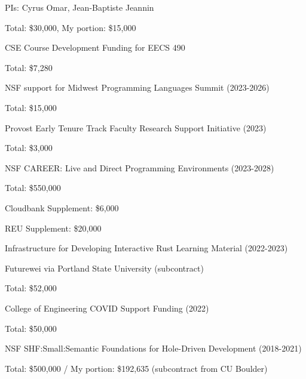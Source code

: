 \documentclass[10pt,letterpaper]{article}
\renewenvironment{itemize}{
  \begin{list}{}{
    \setlength{\leftmargin}{1.25em}
    \setlength{\itemsep}{0.25em}
    \setlength{\parskip}{0pt}
    \setlength{\parsep}{0.2em}
  }
}{
  \end{list}
}
\begin{document}
\begin{itemize}
        \begin{itemize}
          \item PIs: Cyrus Omar, Jean-Baptiste Jeannin
          \item Total: \$30,000, My portion: \$15,000
        \end{itemize}
  \item CSE Course Development Funding for EECS 490
        \begin{itemize}
          \item Total: \$7,280
        \end{itemize}
  \item NSF support for Midwest Programming Languages Summit (2023-2026)
        \begin{itemize}
          \item Total: \$15,000
        \end{itemize}
  \item Provost Early Tenure Track Faculty Research Support Initiative (2023)
        \begin{itemize}
          \item Total: \$3,000
        \end{itemize}
  \item NSF CAREER: Live and Direct Programming Environments (2023-2028)
        \begin{itemize}
          \item Total: \$550,000
          \item Cloudbank Supplement: \$6,000
          \item REU Supplement: \$20,000
        \end{itemize}
  \item Infrastructure for Developing Interactive Rust Learning Material (2022-2023)
        \begin{itemize}
          \item Futurewei via Portland State University (subcontract)
          \item Total: \$52,000
        \end{itemize}
  \item College of Engineering COVID Support Funding (2022)
        \begin{itemize}
          \item Total: \$50,000
        \end{itemize}
  \item NSF SHF:Small:Semantic Foundations for Hole-Driven Development (2018-2021)
        \begin{itemize}
          \item Total: \$500,000 / My portion: \$192,635 (subcontract from CU Boulder)
        \end{itemize}
\end{itemize}
\end{document}
